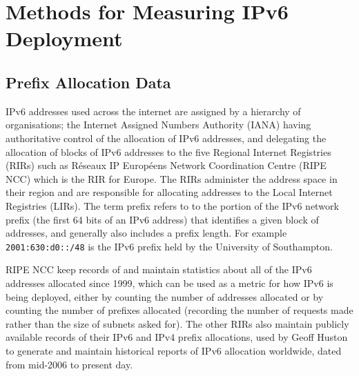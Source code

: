 \section{Methods for Measuring IPv6 Deployment}

\subsection{Prefix Allocation Data}

IPv6 addresses used across the internet are assigned by a hierarchy of
organisations;
the Internet Assigned Numbers Authority (IANA) having authoritative control of the
allocation of IPv6 addresses, and delegating the allocation of blocks of IPv6
addresses to the five Regional Internet Registries (RIRs) such as Réseaux IP Européens
Network Coordination Centre (RIPE NCC) which is the RIR for Europe. The RIRs administer the
address space in their region and are responsible for
allocating addresses to the Local Internet Registries (LIRs). The term prefix
refers to to the portion of the IPv6 network prefix (the first 64 bits of an
IPv6 address) that identifies a given block of addresses, and generally also
includes a prefix length. For example \verb+2001:630:d0::/48+ is the IPv6 prefix held by the
University of Southampton.

RIPE NCC keep records of and maintain statistics about all of the IPv6 addresses
allocated since 1999, which can be used as a metric for how IPv6 is being
deployed, either by counting the number of addresses allocated or by counting
the number of prefixes allocated (recording the number of requests made rather
than the size of subnets asked for). The other RIRs also maintain publicly
available records of their IPv6 and IPv4 prefix allocations, used by Geoff
Huston to generate and maintain historical
reports of IPv6 allocation worldwide, dated from mid-2006 to
present day\cite{huston_ipv6_2013}.

